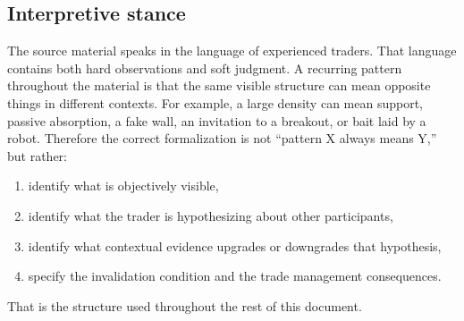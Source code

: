 \subsection{Interpretive stance}

The source material speaks in the language of experienced traders. That language contains both hard observations and soft judgment. A recurring pattern throughout the material is that the same visible structure can mean opposite things in different contexts. For example, a large density can mean support, passive absorption, a fake wall, an invitation to a breakout, or bait laid by a robot. Therefore the correct formalization is not ``pattern X always means Y,'' but rather:

\begin{enumerate}[leftmargin=1.5em]
\item identify what is objectively visible,
\item identify what the trader is hypothesizing about other participants,
\item identify what contextual evidence upgrades or downgrades that hypothesis,
\item specify the invalidation condition and the trade management consequences.
\end{enumerate}

That is the structure used throughout the rest of this document.
